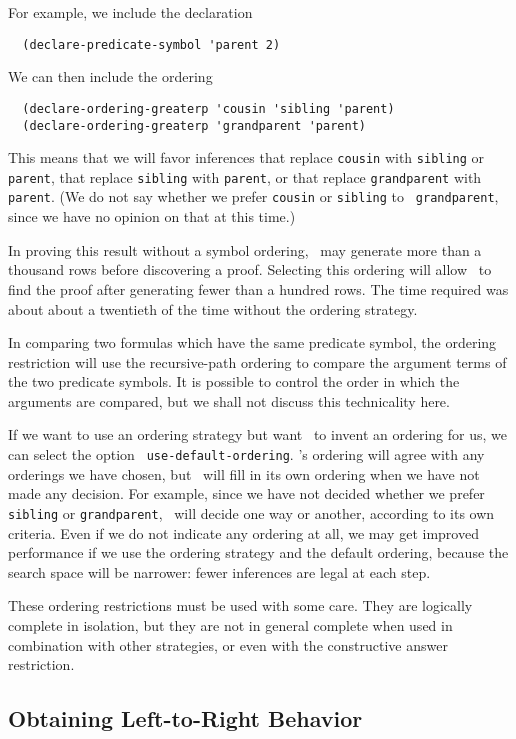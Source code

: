   For example, we include the declaration
\begin{verbatim}
  (declare-predicate-symbol 'parent 2)
\end{verbatim}
We can then include the ordering
\begin{verbatim}
  (declare-ordering-greaterp 'cousin 'sibling 'parent)
  (declare-ordering-greaterp 'grandparent 'parent)
\end{verbatim}
This means that we will favor inferences that replace {\tt cousin}
with {\tt sibling} or {\tt parent}, that replace {\tt sibling} with
{\tt parent}, or that replace {\tt grandparent} with {\tt parent}.  (We
do not say whether we prefer {\tt cousin} or {\tt sibling} to {\tt
grandparent}, since we have no opinion on that at this time.)

 In proving this result without a symbol ordering, \snark\  may
generate more than a thousand rows before discovering a proof.
Selecting this ordering will allow \snark\  to find the proof after
generating fewer than a hundred rows.  The time required was about
about a twentieth of the time without the ordering strategy.

In comparing two formulas which have the same predicate symbol, the
ordering restriction will use the recursive-path ordering to compare
the argument terms of the two predicate symbols.  It is possible to
control the order in which the arguments are compared, but we shall
not discuss this technicality here.

If we want to use an ordering strategy but want \snark\  to invent
an ordering for us, we can select the option {\tt
use-default-ordering}. \Snark\/'s ordering will agree with any
orderings we have chosen, but \snark\  will fill in its own ordering
when we have not made any decision.  For example, since we have not
decided whether we prefer {\tt sibling} or {\tt grandparent}, \snark\
will decide one way or another, according to its own criteria.  Even
if we do not indicate any ordering at all, we may get improved
performance if we use the ordering strategy and the default
ordering, because the search space will be narrower: fewer inferences
are legal at each step.

These ordering restrictions must be used with some care.  They are
logically complete in isolation, but they are not in general complete
when used in combination with other strategies, or even with the
constructive answer restriction.

\subsection{Obtaining Left-to-Right Behavior}

